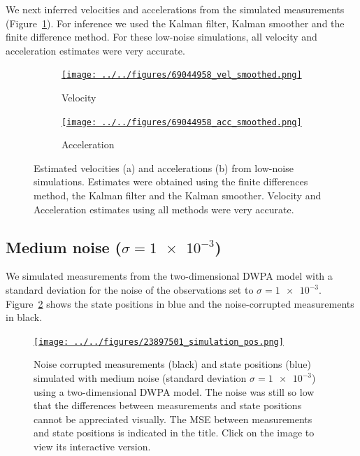 \documentclass[12pt]{article}
\begin{document}
We next inferred velocities and accelerations from the simulated measurements
(Figure~\ref{fig:vel_acc_low_noise}). For inference we used the Kalman filter,
Kalman smoother and the finite difference method. For these low-noise
simulations, all velocity and acceleration estimates were very accurate.

\begin{figure}

    \begin{subfigure}{\textwidth}
        \centering
        \href{http://www.gatsby.ucl.ac.uk/~rapela/fwg/lds_repo/inference/figures/69044958_vel_smoothed.html}{\texttt{[image: ../../figures/69044958\_vel\_smoothed.png]}}
        \caption{Velocity}
    \end{subfigure}

    \begin{subfigure}{\textwidth}
        \centering
        \href{http://www.gatsby.ucl.ac.uk/~rapela/fwg/lds_repo/inference/figures/69044958_acc_smoothed.html}{\texttt{[image: ../../figures/69044958\_acc\_smoothed.png]}}
        \caption{Acceleration}
    \end{subfigure}

    \caption{Estimated velocities (a) and accelerations (b) from low-noise
    simulations.  Estimates were obtained using the finite differences method,
    the Kalman filter and the Kalman smoother. Velocity and Acceleration
    estimates using all methods were very accurate.}

    \label{fig:vel_acc_low_noise}

\end{figure}

\subsection{Medium noise ($\sigma=\num{1e-3}$)}

We simulated measurements from the two-dimensional DWPA model with a standard
deviation for the noise of the observations set to $\sigma=\num{1e-3}$.
Figure~\ref{fig:simulations_medium_noise} shows the state positions in blue and
the noise-corrupted measurements in black.

\begin{figure}

    \centering
    \href{http://www.gatsby.ucl.ac.uk/~rapela/fwg/lds_repo/inference/figures/23897501_simulation_pos.html}{\texttt{[image: ../../figures/23897501\_simulation\_pos.png]}}

    \caption{Noise corrupted measurements (black) and state positions (blue)
    simulated with medium noise (standard deviation $\sigma=\num{1e-3}$) using
    a two-dimensional DWPA model.  The noise was still so low that the
    differences between measurements and state positions cannot be appreciated
    visually.  The MSE between measurements and state positions is indicated in
    the title. Click on the image to view its interactive version.}

    \label{fig:simulations_medium_noise}

\end{figure}
\end{document}
